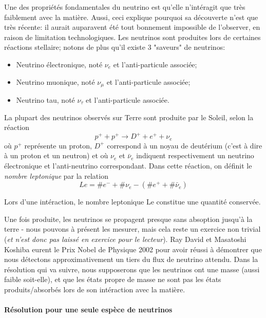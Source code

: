 \documentclass[../notesdecours.tex]{subfiles}
\begin{document}
Une des propriétés fondamentales du neutrino est qu'elle n'intéragit que très faiblement avec la matière. Aussi, ceci explique pourquoi sa découverte n'est que très récente: il aurait auparavent été tout bonnement impossible de l'observer, en raison de limitation technologiques. Les neutrinos sont produites lors de certaines réactions stellaire; notons de plus qu'il existe 3 "saveurs" de neutrinos:
\begin{itemize}
    \item Neutrino électronique, noté $\nu_e$ et l'anti-particule associée;
    \item Neutrino muonique, noté $\nu_\mu$ et l'anti-particule associée;
    \item Neutrino tau, noté $\nu_\tau$ et l'anti-particule associée.
\end{itemize}
La plupart des neutrinos observés sur Terre sont produite par le Soleil, selon la réaction
\begin{equation}\label{eq:reaction neutrino}
    p^+ + p^+ \longrightarrow D^+ + e^+ + \nu_e
\end{equation}
où $p^+$ représente un proton, $D^+$ correspond à \color{purple} un noyau de deutérium (c'est à dire à un proton et un neutron) \color{black}et où $\nu_e$ et $\bar{\nu}_e$ indiquent respectivement un neutrino électronique et l'anti-neutrino correspondant. Dans cette réaction, on définit le \textit{nombre leptonique} par la relation
\begin{equation}
    Le = \#e^- + \#\nu_e - (\#e^++\#\bar{\nu}_e)
\end{equation}
\begin{Property}
    Lors d'une intéraction, le nombre leptonique Le constitue une quantité conservée.
\end{Property}

Une fois produite, les neutrinos se propagent presque sans absoption jusqu'à la terre - nous pouvons à présent les mesurer, mais cela reste un exercice non trivial (\textit{et n'est donc pas laissé en exercice pour le lecteur}). \color{purple} Ray David et Masatoshi Koshiba eurent le Prix Nobel de Physique 2002 pour avoir réussi à démontrer que nous détectons approximativement un tiers du flux de neutrino attendu. \color{black}Dans la résolution qui va suivre, nous supposerons que les neutrinos ont une masse (aussi faible soit-elle), et que les états propre de masse ne sont pas les états produits/absorbés lors de son intéraction avec la matière.

\paragraph{Résolution pour une seule espèce de neutrinos}
\end{document}
